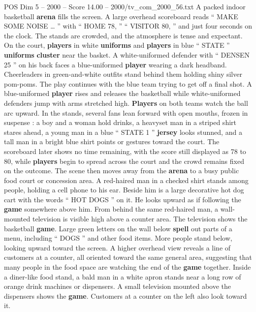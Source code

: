\begin{textsample}{POS Dim 5 – 2000 – Score 14.00 – 2000/tv\_com\_2000\_56.txt}  \label{ex:f5_pos_021}
A packed indoor basketball \textbf{arena} fills the screen.
A large overhead scoreboard reads “ MAKE SOME NOISE … ” with “ HOME 78, ” “ VISITOR 80, ” and just four seconds on the clock.
The stands are crowded, and the atmosphere is tense and expectant.
On the court, \textbf{players} in white \textbf{uniforms} and \textbf{players} in blue “ STATE ” \textbf{uniforms} \textbf{cluster} near the basket.
A white-uniformed defender with “ DENSEN 25 ” on his back faces a blue-uniformed \textbf{player} wearing a dark headband.
Cheerleaders in green-and-white outfits stand behind them holding shiny silver pom-poms.
The play continues with the blue team trying to get off a final shot.
A blue-uniformed \textbf{player} rises and releases the basketball while white-uniformed defenders jump with arms stretched high. \textbf{Players} on both teams watch the ball arc upward.
In the stands, several fans lean forward with open mouths, frozen in suspense : a boy and a woman hold drinks, a heavyset man in a striped shirt stares ahead, a young man in a blue “ STATE 1 ” \textbf{jersey} looks stunned, and a tall man in a bright blue shirt points or gestures toward the court.
The scoreboard later shows no time remaining, with the score still displayed as 78 to 80, while \textbf{players} begin to spread across the court and the crowd remains fixed on the outcome.
The scene then moves away from the \textbf{arena} to a busy public food court or concession area.
A red-haired man in a checked shirt stands among people, holding a cell phone to his ear.
Beside him is a large decorative hot dog cart with the words “ HOT DOGS ” on it.
He looks upward as if following the \textbf{game} somewhere above him.
From behind the same red-haired man, a wall-mounted television is visible high above a counter area.
The television shows the basketball \textbf{game}.
Large green letters on the wall below \textbf{spell} out parts of a menu, including “ DOGS ” and other food items.
More people stand below, looking upward toward the screen.
A higher overhead view reveals a line of customers at a counter, all oriented toward the same general area, suggesting that many people in the food space are watching the end of the \textbf{game} together.
Inside a diner-like food stand, a bald man in a white apron stands near a long row of orange drink machines or dispensers.
A small television mounted above the dispensers shows the \textbf{game}.
Customers at a counter on the left also look toward it.

\end{textsample}
